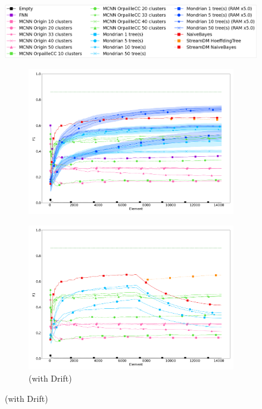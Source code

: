 \begin{figure}
	\centering
	\includegraphics[width=0.8\linewidth]{figures/legend.png}
	\begin{subfigure}[t]{.49\linewidth}
		\includegraphics[width=\linewidth]{figures/results/banos_6_f1_std.png}
		\caption{\banosdataset}
		\label{fig:f1-banos}
	\end{subfigure}
	\begin{subfigure}[t]{.49\linewidth}
		\includegraphics[width=\linewidth]{figures/results/drift_6_f1.png}
		\caption{\banosdataset (with Drift)}

\end{subfigure}
\end{figure}
